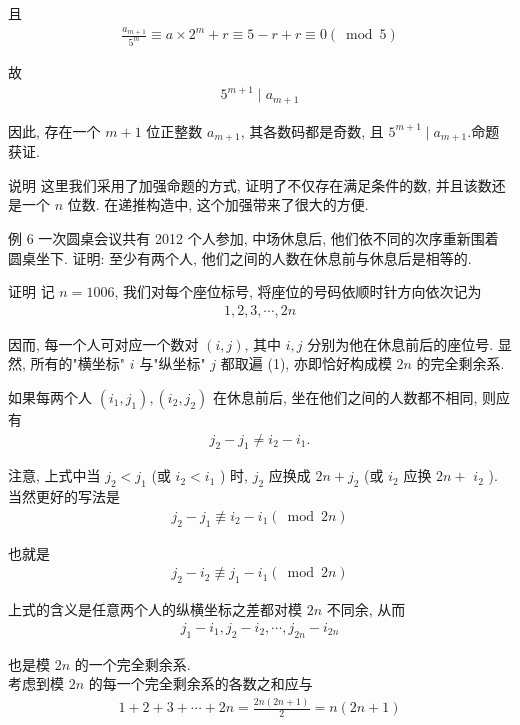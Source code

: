 	且
	\begin{align*}
		\frac{a_{m+1}}{5^{m}} \equiv a \times 2^{m}+r \equiv 5-r+r \equiv 0(\bmod 5)
	\end{align*}

	故
	\begin{align*}
		5^{m+1} \mid a_{m+1}
	\end{align*}

	因此, 存在一个 $m+1$ 位正整数 $a_{m+1}$, 其各数码都是奇数, 且 $5^{m+1} \mid a_{m+1}$.命题获证.

	说明 这里我们采用了加强命题的方式, 证明了不仅存在满足条件的数, 并且该数还是一个 $n$ 位数. 在递推构造中, 这个加强带来了很大的方便.

	例 6 一次圆桌会议共有 2012 个人参加, 中场休息后, 他们依不同的次序重新围着圆桌坐下. 证明: 至少有两个人, 他们之间的人数在休息前与休息后是相等的.

	证明 记 $n=1006$, 我们对每个座位标号, 将座位的号码依顺时针方向依次记为
	\begin{align*}
		1,2,3, \cdots, 2 n
	\end{align*}

	因而, 每一个人可对应一个数对 $(i, j)$, 其中 $i, j$ 分别为他在休息前后的座位号. 显然, 所有的"横坐标" $i$ 与"纵坐标" $j$ 都取遍 (1), 亦即恰好构成模 $2 n$ 的完全剩余系.

	如果每两个人 $\left(i_{1}, j_{1}\right),\left(i_{2}, j_{2}\right)$ 在休息前后, 坐在他们之间的人数都不相同, 则应有
	\begin{align*}
		j_{2}-j_{1} \neq i_{2}-i_{1} .
	\end{align*}

	注意, 上式中当 $j_{2}<j_{1}$ (或 $i_{2}<i_{1}$ ) 时,  $j_{2}$ 应换成 $2 n+j_{2}$ (或 $i_{2}$ 应换 $2 n+$ $i_{2}$ ). 当然更好的写法是
	\begin{align*}
		j_{2}-j_{1} \not \equiv i_{2}-i_{1}(\bmod 2 n)
	\end{align*}

	也就是
	\begin{align*}
		j_{2}-i_{2} \not \equiv j_{1}-i_{1}(\bmod 2 n)
	\end{align*}

	上式的含义是任意两个人的纵横坐标之差都对模 $2 n$ 不同余, 从而
	\begin{align*}
		j_{1}-i_{1}, j_{2}-i_{2}, \cdots, j_{2 n}-i_{2 n}
	\end{align*}

	也是模 $2 n$ 的一个完全剩余系. \\
	考虑到模 $2 n$ 的每一个完全剩余系的各数之和应与
	\begin{align*}
		1+2+3+\cdots+2 n=\frac{2 n(2 n+1)}{2}=n(2 n+1)
	\end{align*}

